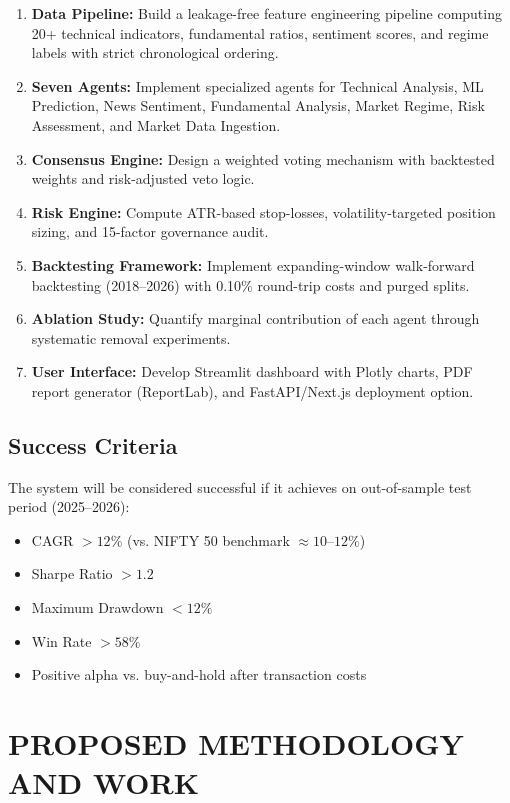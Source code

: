 \documentclass[12pt,a4paper]{report}
\begin{document}
\begin{enumerate}
    \item \textbf{Data Pipeline:} Build a leakage-free feature engineering pipeline computing 20+ technical indicators, fundamental ratios, sentiment scores, and regime labels with strict chronological ordering.
    \item \textbf{Seven Agents:} Implement specialized agents for Technical Analysis, ML Prediction, News Sentiment, Fundamental Analysis, Market Regime, Risk Assessment, and Market Data Ingestion.
    \item \textbf{Consensus Engine:} Design a weighted voting mechanism with backtested weights and risk-adjusted veto logic.
    \item \textbf{Risk Engine:} Compute ATR-based stop-losses, volatility-targeted position sizing, and 15-factor governance audit.
    \item \textbf{Backtesting Framework:} Implement expanding-window walk-forward backtesting (2018--2026) with 0.10\% round-trip costs and purged splits.
    \item \textbf{Ablation Study:} Quantify marginal contribution of each agent through systematic removal experiments.
    \item \textbf{User Interface:} Develop Streamlit dashboard with Plotly charts, PDF report generator (ReportLab), and FastAPI/Next.js deployment option.
\end{enumerate}

\section{Success Criteria}
The system will be considered successful if it achieves on out-of-sample test period (2025--2026):
\begin{itemize}
    \item CAGR $> 12\%$ (vs. NIFTY 50 benchmark $\approx 10\text{--}12\%$)
    \item Sharpe Ratio $> 1.2$
    \item Maximum Drawdown $< 12\%$
    \item Win Rate $> 58\%$
    \item Positive alpha vs. buy-and-hold after transaction costs
\end{itemize}

\chapter{PROPOSED METHODOLOGY AND WORK}
\end{document}
